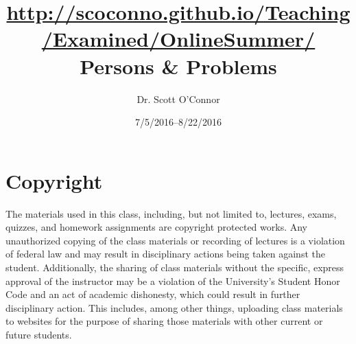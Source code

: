 \documentclass[article,oneside]{memoir}
\def\myauthor{Author}
\def\mytitle{Title}
\def\mycopyright{\myauthor}
\def\myweb{\href{http://scoconno.github.io/Teaching/Examined/OnlineSummer/}{http://scoconno.github.io/Teaching/Examined/OnlineSummer/}}
\def\myauthor{Dr. Scott O'Connor}
\def\mytitle{{\normalsize \myweb \newline} \HUGE Persons \& Problems}
\begin{document}
\setsansfont[Mapping=tex-text]{Myriad Pro} 
\setmonofont[Mapping=tex-text,Scale=0.8]{Georgia} 

\def\ind{\hangindent=1 true cm\hangafter=1 \noindent}
\def\labelitemi{$\cdot$}


\title{\LARGE \mytitle}     
\author{\Large\myauthor %
}
\date{7/5/2016--8/22/2016}


\maketitle




%
%

\section{Copyright}
The materials used in this class, including, but not limited to, lectures, exams, quizzes, and homework assignments are copyright protected works.  Any unauthorized copying of the class materials or recording of lectures is a violation of federal law and may result in disciplinary actions being taken against the student.  Additionally, the sharing of class materials without the specific, express approval of the instructor may be a violation of the University's Student Honor Code and an act of academic dishonesty, which could result in further disciplinary action.  This includes, among other things, uploading class materials to websites for the purpose of sharing those materials with other current or future students. 
\end{document}
